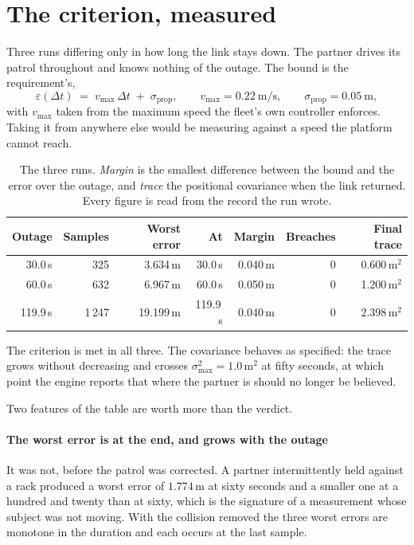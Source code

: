 \documentclass[11pt,a4paper]{article}
\theoremstyle{definition}
\begin{document}
\section{The criterion, measured}
\label{sec:measured}

Three runs differing only in how long the link stays down. The partner drives
its patrol throughout and knows nothing of the outage. The bound is the
requirement's,
\[
  \varepsilon(\Delta t) \;=\; v_{\max}\,\Delta t \;+\; \sigma_{\mathrm{prop}},
  \qquad v_{\max} = 0.22\ \mathrm{m/s}, \qquad
  \sigma_{\mathrm{prop}} = 0.05\ \mathrm{m},
\]
with $v_{\max}$ taken from the maximum speed the fleet's own controller
enforces. Taking it from anywhere else would be measuring against a speed the
platform cannot reach.

\begin{table}[H]
\centering\small
\caption{The three runs. \emph{Margin} is the smallest difference between the
bound and the error over the outage, and \emph{trace} the positional covariance
when the link returned. Every figure is read from the record the run wrote.}
\label{tab:runs}
\begin{tabular}{@{}rrrrrrr@{}}
\toprule
\textbf{Outage} & \textbf{Samples} & \textbf{Worst error} & \textbf{At} &
\textbf{Margin} & \textbf{Breaches} & \textbf{Final trace} \\
\midrule
 30.0\,s &    325 &  3.634\,m &  30.0\,s & 0.040\,m & 0 & 0.600\,m$^2$ \\
 60.0\,s &    632 &  6.967\,m &  60.0\,s & 0.050\,m & 0 & 1.200\,m$^2$ \\
119.9\,s & 1\,247 & 19.199\,m & 119.9\,s & 0.040\,m & 0 & 2.398\,m$^2$ \\
\bottomrule
\end{tabular}
\end{table}

The criterion is met in all three. The covariance behaves as specified: the
trace grows without decreasing and crosses $\sigma_{\max}^2 = 1.0$\,m$^2$ at
fifty seconds, at which point the engine reports that where the partner is
should no longer be believed.

Two features of the table are worth more than the verdict.

\paragraph{The worst error is at the end, and grows with the outage} It was not,
before the patrol was corrected. A partner intermittently held against a rack
produced a worst error of $1.774$\,m at sixty seconds and a smaller one at a
hundred and twenty than at sixty, which is the signature of a measurement whose
subject was not moving. With the collision removed the three worst errors are
monotone in the duration and each occurs at the last sample.
\end{document}

